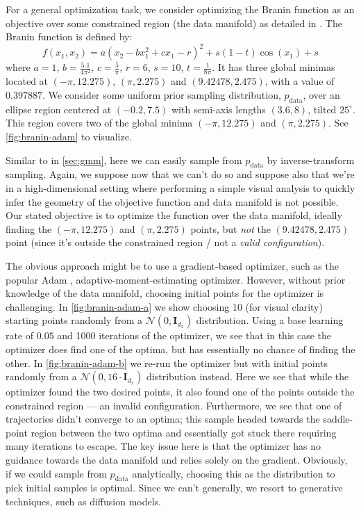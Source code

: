 For a general optimization task, we consider optimizing the Branin function as an objective over
some constrained region (the data manifold) as detailed in
\textcite{kongDiffusionModelsConstrained2024}. The Branin function is defined by:
\begin{equation}
    f(x_1, x_2) = a(x_2 - bx_1^2 + cx_1 - r)^2 + s(1-t)\cos(x_1) + s \label{eq:branin}
\end{equation}
where $a=1$, $b = \frac{5.1}{4\pi^2}$, $c=\frac{5}{\pi}$, $r=6$, $s=10$, $t=\frac{1}{8\pi}$.
It has three global minimas located at $(-\pi, 12.275)$, $(\pi, 2.275)$ and $(9.42478, 2.475)$,
with a value of $0.397887$. We consider some uniform prior sampling distribution, $p_{\text{data}}$,
over an ellipse region centered at $(-0.2, 7.5)$ with semi-axis lengths $(3.6, 8)$, tilted
$25^\circ$. This region covers two of the global minima $(-\pi, 12.275)$ and $(\pi, 2.275)$.
See \autoref{fig:branin-adam} to visualize.

Similar to in \autoref{sec:gmm}, here we can easily sample from $p_{\text{data}}$ by inverse-transform
sampling. Again, we suppose now that we can't do so and suppose also that we're in a high-dimensional
setting where performing a simple visual analysis to quickly infer the geometry of the objective
function and data manifold is not possible. Our stated objective is to optimize the function over
the data manifold, ideally finding the $(-\pi, 12.275)$ and $(\pi, 2.275)$ points, but \emph{not}
the $(9.42478, 2.475)$ point (since it's outside the constrained region / not a \emph{valid
configuration}).

The obvious approach might be to use a gradient-based optimizer, such as the popular
Adam \parencite{kingmaAdamMethodStochastic2017}, adaptive-moment-estimating optimizer. However,
without prior knowledge of the data manifold, choosing initial points for the optimizer is
challenging. In \autoref{fig:branin-adam-a} we show choosing 10 (for visual clarity) starting points
randomly from a $\mathcal{N}(0, \mathbf{I}_{d_x})$ distribution. Using a base learning rate of
$0.05$ and 1000 iterations of the optimizer, we see that in this case the optimizer does find one of
the optima, but has essentially no chance of finding the other. In \autoref{fig:branin-adam-b} we re-run
the optimizer but with initial points randomly from a $\mathcal{N}(0, 16\cdot\mathbf{I}_{d_x})$
distribution instead. Here we see that while the optimizer found the two desired points, it also found
one of the points outside the constrained region --- an invalid configuration. Furthermore, we see
that one of trajectories didn't converge to an optima; this sample headed towards the saddle-point
region between the two optima and essentially got stuck there requiring many iterations to escape.
The key issue here is that the optimizer has no guidance towards the data manifold and relies solely
on the gradient. Obviously, if we could sample from $p_{\text{data}}$ analytically, choosing this as
the distribution to pick initial samples is optimal. Since we can't generally, we resort to
generative techniques, such as diffusion models.

